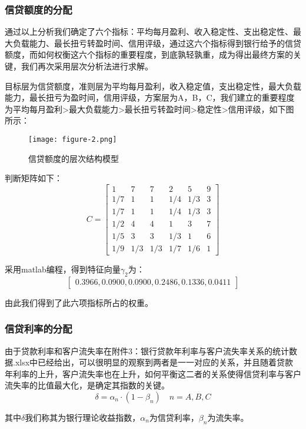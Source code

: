 \documentclass[dvipsnames,withoutpreface,bwprint]{cumcmthesis}
\begin{document}
\subsubsection{信贷额度的分配}
通过以上分析我们确定了六个指标：平均每月盈利、收入稳定性、支出稳定性、最大负载能力、最长扭亏转盈时间、信用评级，通过这六个指标得到银行给予的信贷额度，而如何权衡这六个指标的重要程度，到底孰轻孰重，成为得出最终方案的关键，我们再次采用层次分析法进行求解。
\par 目标层为信贷额度，准则层为平均每月盈利，收入稳定值，支出稳定性，最大负载能力，最长扭亏为盈时间，信用评级，方案层为A，B，C，我们建立的重要程度为平均每月盈利>最大负载能力>最长扭亏转盈时间>稳定性>信用评级，如下图所示：
\begin{figure}[H]
    \centering
    \texttt{[image: figure-2.png]}
    \caption{信贷额度的层次结构模型}
    \label{fig:3}%
\end{figure}
判断矩阵如下：
\[C=\begin{bmatrix}
    1 &7 &7 &2 &5 &9 \\
    1/7 &1 &1 &1/4 &1/3 &3 \\
    1/7 &1 &1 &1/4 &1/3 &3 \\
    1/2 &4 &4 &1 &3 &7 \\
    1/5 &3 &3 &1/3 &1 &6 \\
    1/9 &1/3 &1/3 &1/7 &1/6 &1
\end{bmatrix}\]
\par 采用matlab编程，得到特征向量$\gamma_2$为：
\[\begin{bmatrix}
    0.3966    ,0.0900   ,0.0900   ,0.2486   ,0.1336   ,0.0411
\end{bmatrix}\]
\par 由此我们得到了此六项指标所占的权重。
\subsubsection{信贷利率的分配}
由于贷款利率和客户流失率在附件3：银行贷款年利率与客户流失率关系的统计数据.xlsx中已经给出，可以很明显的观察到两者是一一对应的关系，并且随着贷款年利率的上升，客户流失率也在上升，如何平衡这二者的关系使得信贷利率与客户流失率的比值最大化，是确定其指数的关键。
\begin{equation}
    \delta =\alpha_n \cdot(1-\beta_n) \quad n=A,B,C
\end{equation}
\par 其中$\delta$我们称其为银行理论收益指数，$\alpha_n$为信贷利率，$\beta_n$为流失率。
\end{document}
